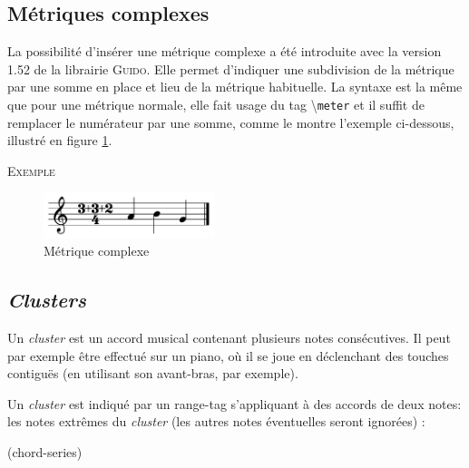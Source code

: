 \documentclass{article}
\newenvironment{gmncode}	{\vspace{-2mm}\small\verbatim}{\endverbatim\vspace{-2mm}}
\newcommand{\guido}			{\textsc{Guido}}
\newcommand{\code}[1]		{{\small \texttt{#1}}}
\newcommand{\guidotag}[1]	{\textbackslash\code{#1}}
\newcommand{\exemple}		{\vspace{2mm}\hspace*{-6mm}\textsc{Exemple}}
\begin{document}
\subsection{Métriques complexes}\label{subsec:metriques}

La possibilité d'insérer une métrique complexe a été introduite avec la version 1.52 de la librairie \guido{}. Elle permet d'indiquer une subdivision de la métrique par une somme en place et lieu de la métrique habituelle. La syntaxe est la même que pour une métrique normale, elle fait usage du tag \guidotag{meter} et il suffit de remplacer le numérateur par une somme, comme le montre l'exemple ci-dessous, illustré en figure \ref{fig:complexMeter}.

\exemple\\
\begin{gmncode}
  [ \meter<"3+3+2/4"> a b g ]
\end{gmncode}

\begin{figure}[h]
\centering
\includegraphics[width=50mm]{img/partitions/complexMeter.pdf}
\caption{Métrique complexe}
\label{fig:complexMeter}
\end{figure}

\subsection{\emph{Clusters}}\label{subsec:clusters}

Un \emph{cluster} est un accord musical contenant plusieurs notes consécutives. Il peut par exemple être effectué sur un piano, où il se joue en déclenchant des touches contiguës (en utilisant son avant-bras, par exemple).

Un \emph{cluster} est indiqué par un range-tag s'appliquant à des accords de deux notes: les notes extrêmes du \emph{cluster} (les autres notes éventuelles seront ignorées) :

\begin{gmncode}
(chord-series)
\end{gmncode}
\end{document}
